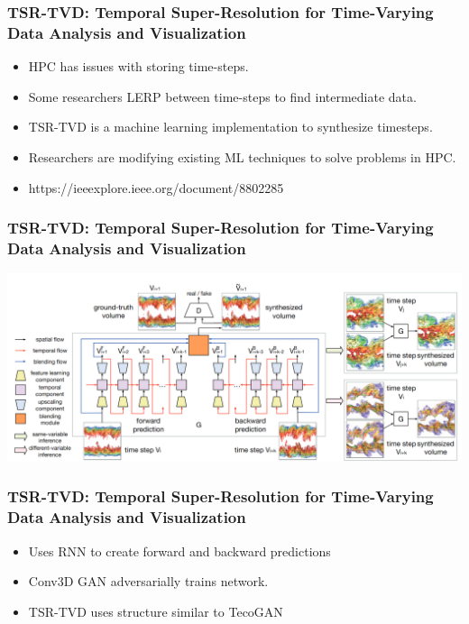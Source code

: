 \begin{frame}
\frametitle{TSR-TVD: Temporal Super-Resolution for Time-Varying Data Analysis and
    Visualization}
    \begin{itemize}
        \item HPC has issues with storing time-steps.
        \item Some researchers LERP between time-steps to find intermediate
        data.
        \item TSR-TVD is a machine learning implementation to synthesize
        timesteps.
        \item Researchers are modifying existing ML techniques to solve problems
        in HPC.
        \item https://ieeexplore.ieee.org/document/8802285
    \end{itemize}
\end{frame}

\begin{frame}
\frametitle{TSR-TVD: Temporal Super-Resolution for Time-Varying Data Analysis and
    Visualization}
    \center\includegraphics[width=0.9\paperwidth]{TSR.png}
\end{frame}

\begin{frame}
\frametitle{TSR-TVD: Temporal Super-Resolution for Time-Varying Data Analysis and
    Visualization}
    \begin{itemize}
        \item Uses RNN to create forward and backward predictions
        \item Conv3D GAN adversarially trains network.
        \item TSR-TVD uses structure similar to TecoGAN
    \end{itemize}
\end{frame}

